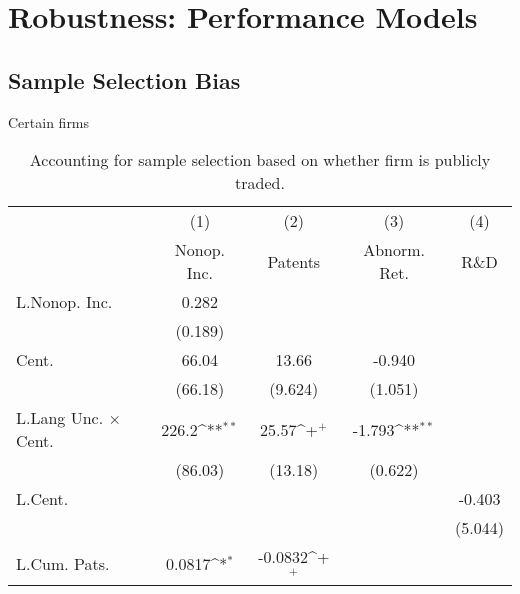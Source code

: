 \chapter{Robustness: Performance Models\label{apndxB}}

\section{Sample Selection Bias}

Certain firms 

\begin{table}
\begin{center}
\caption[Sample Selection on Public]{Accounting for sample selection based on whether firm is publicly traded.\label{sel1}}
\vspace{0.3in}
{
\def\sym#1{\ifmmode^{#1}\else\(^{#1}\)\fi}
\begin{tabular}{l*{4}{c}}
\hline\hline
                    &\multicolumn{1}{c}{(1)}&\multicolumn{1}{c}{(2)}&\multicolumn{1}{c}{(3)}&\multicolumn{1}{c}{(4)}\\
                    &\multicolumn{1}{c}{Nonop. Inc.}&\multicolumn{1}{c}{Patents}&\multicolumn{1}{c}{Abnorm. Ret.}&\multicolumn{1}{c}{R\&D}\\
\hline
L.Nonop. Inc.       &       0.282         &                     &                     &                     \\
                    &     (0.189)         &                     &                     &                     \\
Cent.               &       66.04         &       13.66         &      -0.940         &                     \\
                    &     (66.18)         &     (9.624)         &     (1.051)         &                     \\
L.Lang Unc. $\times$ Cent.&       226.2\sym{**} &       25.57\sym{+}  &      -1.793\sym{**} &                     \\
                    &     (86.03)         &     (13.18)         &     (0.622)         &                     \\
L.Cent.             &                     &                     &                     &      -0.403         \\
                    &                     &                     &                     &     (5.044)         \\
L.Cum. Pats.        &      0.0817\sym{*}  &     -0.0832\sym{+}  &                     &                     \\

\end{tabular}}
\end{center}
\end{table}
